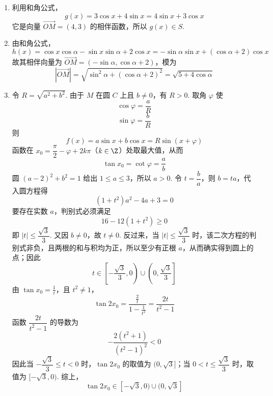\begin{solution}
\begin{enumerate}
\item 利用和角公式，
\[
g(x)=3\cos x+4\sin x=4\sin x+3\cos x
\]
它是向量 \(\overrightarrow{OM}=(4,3)\) 的相伴函数，所以 \(g(x)\in S\).

\item 由和角公式，
\[
h(x)=\cos x\cos\alpha-\sin x\sin\alpha+2\cos x
=-\sin\alpha\sin x+(\cos\alpha+2)\cos x
\]
故其相伴向量为 \(\overrightarrow{OM}=(-\sin\alpha,\cos\alpha+2)\)，模为
\[
\left|\overrightarrow{OM}\right|
=\sqrt{\sin^2\alpha+(\cos\alpha+2)^2}
=\sqrt{5+4\cos\alpha}
\]

\item 令 \(R=\sqrt{a^2+b^2}\). 由于 \(M\) 在圆 \(C\) 上且 \(b\ne0\)，有 \(R>0\). 取角 \(\varphi\) 使
\[
\cos\varphi=\frac aR
\]
\[
\sin\varphi=\frac bR
\]
则
\[
f(x)=a\sin x+b\cos x=R\sin(x+\varphi)
\]
函数在 \(x_0=\dfrac\pi2-\varphi+2k\pi\)（\(k\in\Z\)）处取最大值，从而
\[
\tan x_0=\cot\varphi=\frac ab
\]
圆 \((a-2)^2+b^2=1\) 给出 \(1\le a\le3\)，所以 \(a>0\). 令 \(t=\dfrac ba\)，则 \(b=ta\)，代入圆方程得
\[
(1+t^2)a^2-4a+3=0
\]
要存在实数 \(a\)，判别式必须满足
\[
16-12(1+t^2)\ge0
\]
即 \(|t|\le\dfrac{\sqrt3}{3}\). 又因 \(b\ne0\)，故 \(t\ne0\). 反过来，当 \(|t|\le\dfrac{\sqrt3}{3}\) 时，该二次方程的判别式非负，且两根的和与积均为正，所以至少有正根 \(a\)，从而确实得到圆上的点；因此
\[
t\in\left[-\frac{\sqrt3}{3},0\right)\cup\left(0,\frac{\sqrt3}{3}\right]
\]
由 \(\tan x_0=\frac{1}{t}\)，且 \(t^2\ne1\)，
\[
\tan2x_0=\frac{\frac{2}{t}}{1-\frac{1}{t^2}}=\frac{2t}{t^2-1}
\]
函数 \(\dfrac{2t}{t^2-1}\) 的导数为
\[
-\frac{2(t^2+1)}{(t^2-1)^2}<0
\]
因此当 \(-\dfrac{\sqrt3}{3}\le t<0\) 时，\(\tan2x_0\) 的取值为 \((0,\sqrt3]\)；当 \(0<t\le\dfrac{\sqrt3}{3}\) 时，取值为 \([-\sqrt3,0)\). 综上，
\[
\tan2x_0\in[-\sqrt3,0)\cup(0,\sqrt3]
\]
\end{enumerate}
\end{solution}

